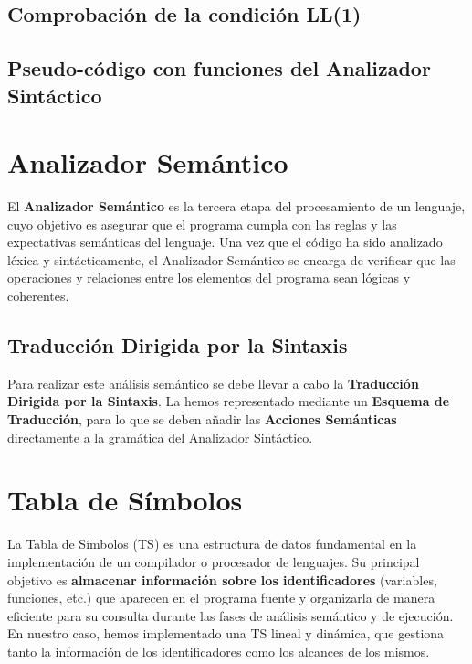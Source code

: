 \documentclass{article}
\begin{document}


\subsection{Comprobación de la condición LL(1)}



\subsection{Pseudo-código con funciones del Analizador Sintáctico}



\section{Analizador Semántico}
El \textbf{Analizador Semántico} es la tercera etapa del procesamiento de un lenguaje, cuyo objetivo es asegurar que el programa cumpla con las reglas y las expectativas semánticas del lenguaje. Una vez que el código ha sido analizado léxica y sintácticamente, el Analizador Semántico se encarga de verificar que las operaciones y relaciones entre los elementos del programa sean lógicas y coherentes. 

\subsection{Traducción Dirigida por la Sintaxis}
Para realizar este análisis semántico se debe llevar a cabo la \textbf{Traducción Dirigida por la Sintaxis}. La hemos representado mediante un \textbf{Esquema de Traducción}, para lo que se deben añadir las \textbf{Acciones Semánticas} directamente a la gramática del Analizador Sintáctico. 



\section{Tabla de Símbolos}
La Tabla de Símbolos (TS) es una estructura de datos fundamental en la implementación de un compilador o procesador de lenguajes. Su principal objetivo es \textbf{almacenar información sobre los identificadores} (variables, funciones, etc.) que aparecen en el programa fuente y organizarla de manera eficiente para su consulta durante las fases de análisis semántico y de ejecución. En nuestro caso, hemos implementado una TS lineal y dinámica, que gestiona tanto la información de los identificadores como los alcances de los mismos.
\end{document}
